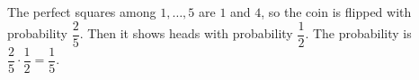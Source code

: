 The perfect squares among $1,\dots,5$ are $1$ and $4$, so the coin is flipped with probability $\dfrac{2}{5}$. Then it shows heads with probability $\dfrac{1}{2}$. The probability is $\dfrac{2}{5}\cdot\dfrac{1}{2}=\boxed{\dfrac{1}{5}}$.
